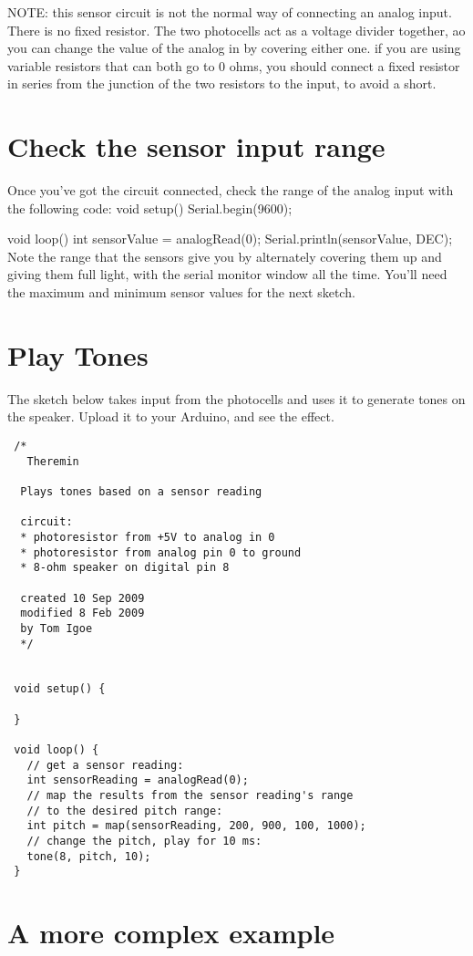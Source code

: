 NOTE: this sensor circuit is not the normal way of connecting an analog input. There is no fixed resistor. The two photocells act as a voltage divider together, ao you can change the value of the analog in by covering either one. if you are using variable resistors that can both go to 0 ohms, you should connect a fixed resistor in series from the junction of the two resistors to the input, to avoid a short.

\section{Check the sensor input range}

Once you've got the circuit connected, check the range of the analog input with the following code:
 void setup() {
   Serial.begin(9600);
 }

 void loop() {
   int sensorValue = analogRead(0);
   Serial.println(sensorValue, DEC);
 }
Note the range that the sensors give you by alternately covering them up and giving them full light, with the serial monitor window all the time. You'll need the maximum and minimum sensor values for the next sketch.

\section{Play Tones}

The sketch below takes input from the photocells and uses it to generate tones on the speaker. Upload it to your Arduino, and see the effect.

\begin{verbatim}
 /*
   Theremin
  
  Plays tones based on a sensor reading
  
  circuit:
  * photoresistor from +5V to analog in 0
  * photoresistor from analog pin 0 to ground
  * 8-ohm speaker on digital pin 8
  
  created 10 Sep 2009
  modified 8 Feb 2009
  by Tom Igoe 
  */


 void setup() {

 }

 void loop() {
   // get a sensor reading:
   int sensorReading = analogRead(0);
   // map the results from the sensor reading's range
   // to the desired pitch range:
   int pitch = map(sensorReading, 200, 900, 100, 1000);
   // change the pitch, play for 10 ms:
   tone(8, pitch, 10);
 }
\end{verbatim}

\section{A more complex example}

